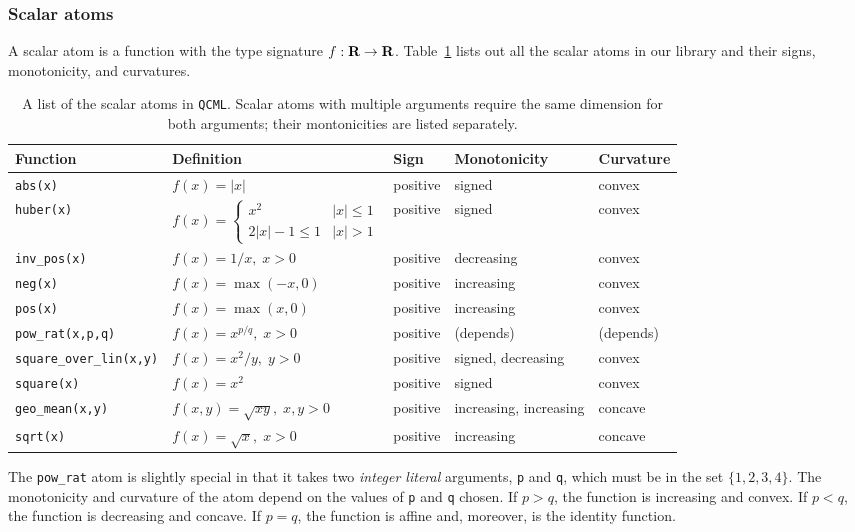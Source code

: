 \documentclass[11pt]{article}
\def\qcml{\texttt{QCML}\xspace}
\newcommand{\reals}{{\mbox{\bf R}}}
\begin{document}
\subsubsection{Scalar atoms}
A scalar atom is a function with the type signature $f : \reals \to \reals$.
Table~\ref{t-scalar-atoms} lists out all the scalar atoms in our library
and their signs, monotonicity, and curvatures.
\begin{table}
  \small
  \renewcommand{\arraystretch}{1.5}
  \centering
\begin{tabular}{|l|l||l|l|l|} \hline
  Function & Definition & Sign & Monotonicity & Curvature \\ \hline
  {\tt abs(x)} & $f(x) = |x|$ & positive & signed & convex \\ \hline
  {\tt huber(x)} & $f(x) = \begin{cases} x^2 & |x| \leq 1 \\
    2|x| - 1 \leq 1 & |x| > 1 \end{cases}$ & positive & signed & convex \\ \hline
  {\tt inv\_pos(x)} & $f(x) = 1/x, \; x > 0$ & positive & decreasing & convex \\ \hline
  {\tt neg(x)} & $f(x) = \max(-x, 0)$ & positive & increasing & convex \\ \hline
  {\tt pos(x)} & $f(x) = \max(x, 0)$ & positive & increasing & convex \\ \hline
  {\tt pow\_rat(x,p,q)} & $f(x) = x^{p/q}, \; x >0$ & positive & (depends) & (depends) \\ \hline
  {\tt square\_over\_lin(x,y)} & $f(x) = x^2/y, \; y >0$ & positive & signed, decreasing & convex\\ \hline
  {\tt square(x)} & $f(x) = x^2$ & positive & signed & convex\\ \hline
  {\tt geo\_mean(x,y)} & $f(x,y) = \sqrt{xy}, \; x,y >0$ & positive & increasing, increasing & concave \\ \hline
  {\tt sqrt(x)} & $f(x) = \sqrt{x}, \; x >0$ & positive & increasing & concave \\ \hline
\end{tabular}
\caption{A list of the scalar atoms in \qcml. Scalar atoms with multiple arguments
require the same dimension for both arguments; their montonicities are listed separately.}
\label{t-scalar-atoms}
\end{table}

The {\tt pow\_rat} atom is slightly special in that it takes two \emph{integer
literal} arguments, {\tt p} and {\tt q}, which must be in the set $\{1,2,3,4\}$.
The monotonicity and curvature of the atom depend on the values of {\tt p}
and {\tt q} chosen. If $p > q$, the function is increasing and convex.
If $p < q$, the function is decreasing and concave. If $p = q$, the function
is affine and, moreover, is the identity function.
\end{document}
